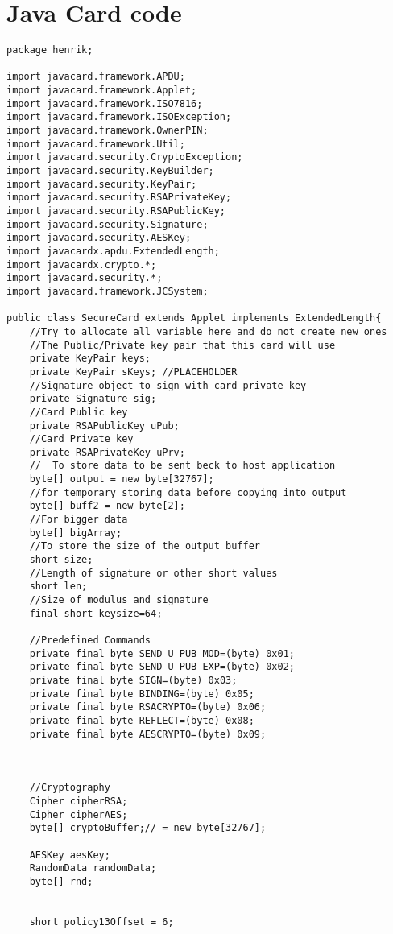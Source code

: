 \chapter{Java Card code}
\label{app:A}
\begin{lstlisting}[caption=SecureCard.java.,breaklines=true,breakatwhitespace=false, label=lst:SecureCard,escapechar=!]
package henrik;

import javacard.framework.APDU;
import javacard.framework.Applet;
import javacard.framework.ISO7816;
import javacard.framework.ISOException;
import javacard.framework.OwnerPIN;
import javacard.framework.Util;
import javacard.security.CryptoException;
import javacard.security.KeyBuilder;
import javacard.security.KeyPair;
import javacard.security.RSAPrivateKey;
import javacard.security.RSAPublicKey;
import javacard.security.Signature;
import javacard.security.AESKey;
import javacardx.apdu.ExtendedLength;
import javacardx.crypto.*;
import javacard.security.*;
import javacard.framework.JCSystem;

public class SecureCard extends Applet implements ExtendedLength{
	//Try to allocate all variable here and do not create new ones
	//The Public/Private key pair that this card will use
	private KeyPair keys;
	private KeyPair sKeys; //PLACEHOLDER
	//Signature object to sign with card private key
	private Signature sig;
	//Card Public key
	private RSAPublicKey uPub;
    //Card Private key
	private RSAPrivateKey uPrv;
    //	To store data to be sent beck to host application
	byte[] output = new byte[32767];
	//for temporary storing data before copying into output
	byte[] buff2 = new byte[2];
	//For bigger data
	byte[] bigArray;
	//To store the size of the output buffer
	short size;
	//Length of signature or other short values
	short len;
	//Size of modulus and signature
	final short keysize=64;

	//Predefined Commands
	private final byte SEND_U_PUB_MOD=(byte) 0x01;
	private final byte SEND_U_PUB_EXP=(byte) 0x02;
	private final byte SIGN=(byte) 0x03;
	private final byte BINDING=(byte) 0x05;
	private final byte RSACRYPTO=(byte) 0x06;
	private final byte REFLECT=(byte) 0x08;
	private final byte AESCRYPTO=(byte) 0x09;



	//Cryptography
	Cipher cipherRSA;
	Cipher cipherAES;
	byte[] cryptoBuffer;// = new byte[32767];

	AESKey aesKey;
	RandomData randomData;
	byte[] rnd;


	short policy13Offset = 6;



\end{lstlisting}
